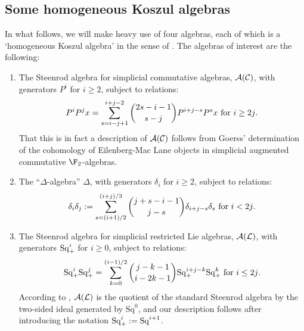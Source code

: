 \documentclass[10pt]{article}
\newcommand{\trip}[3]{{#1}_{\smash{#2}}^{\smash{#3}}}
\newcommand{\SqShift}{\Sq_{\smash{+}}}
\newcommand{\Sq}{\mathrm{Sq}}
\newcommand{\Comm}{\calC}
\newcommand{\LieSteen}{\calA(\calL)}
\newcommand{\CommSteen}{\calA(\Comm)}
\newcommand{\deltaAlgebra}{\Delta}
\begin{document}

\begin{SteenrodAlgebrasAndTheirKoszulDuals}
\section{Some homogeneous Koszul algebras}
In what follows, we will make heavy use of four algebras, each of which is a `homogeneous Koszul algebra' in the sense of \cite{PriddyKoszul.pdf}. The algebras of interest are the following:
\begin{enumerate}\squishlist
\setlength{\parindent}{.25in}
\item The Steenrod algebra for simplicial commutative algebras, $\CommSteen$, with generators $P^i$ for $i\geq2$, subject to relations:
\[P^iP^jx=\sum_{s=i-j+1}^{i+j-2}{2s-i-1\choose s-j}P^{i+j-s}P^sx\textup{ for $i\geq2j$}.\]
That this is in fact a description of $\CommSteen$ follows from Goerss' determination \cite[p.14]{MR1089001} of the cohomology of Eilenberg-Mac Lane objects in simplicial augmented commutative $\F_2$-algebras.

\item The ``$\Delta$-algebra'' $\deltaAlgebra$, with generators $\delta_i$ for $i\geq2$, subject to relations:
\[\delta_i\delta_j:=\sum_{s=(i+1)/2}^{(i+j)/3}{j+s-i-1\choose j-s}\delta_{i+j-s}\delta_s\textup{ for $i<2j$.}\]
\item The Steenrod algebra for simplicial restricted Lie algebras, $\LieSteen$, with generators $\SqShift^i$ for $i\geq0$, subject to relations:
\[\SqShift^i\SqShift^j=\sum_{k=0}^{(i-1)/2}{j-k-1\choose i-2k-1}\SqShift^{i+j-k}\SqShift^k\textup{\ for $i\leq2j$.}\]
According to \cite[\S7]{PriddySimplicialLie.pdf}, $\LieSteen$ is the quotient of the standard Steenrod algebra by the two-sided ideal generated by $\Sq^0$, and our description follows after introducing the notation $\SqShift^i:=\Sq^{i+1}$.
%


\end{enumerate}
\end{SteenrodAlgebrasAndTheirKoszulDuals}
\end{document}
